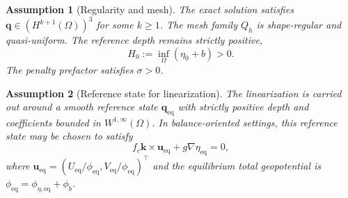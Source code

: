 \documentclass[pdflatex,sn-mathphys-num]{sn-jnl}%
\theoremstyle{thmstyleone}%
\newtheorem{assumption}{Assumption}
\theoremstyle{thmstyletwo}%
\theoremstyle{thmstylethree}%
\begin{document}
\begin{assumption}[Regularity and mesh]
\label{asm:regularity}
The exact solution satisfies $\mathbf{q}\in \left(H^{k+1}(\Omega)\right)^3$ for some $k\ge 1$. The mesh family $Q_h$ is shape-regular and quasi-uniform. The reference depth remains strictly positive,
\[
H_0:=\inf_{\Omega}(\eta_0+b)>0.
\]
The penalty prefactor satisfies $\sigma > 0$.
\end{assumption}

\begin{assumption}[Reference state for linearization]
\label{asm:reference}
The linearization is carried out around a smooth reference state $\mathbf q_{\mathrm{eq}}$ with strictly positive depth and coefficients bounded in $W^{1,\infty}(\Omega)$. 
In balance-oriented settings, this reference state may be chosen to satisfy
\[
f_c\mathbf{k}\times \mathbf{u}_{\mathrm{eq}} + g\nabla \eta_{\mathrm{eq}} = 0,
\]
where $\mathbf{u}_{\mathrm{eq}} = (U_{\mathrm{eq}}/\phi_{\mathrm{eq}}, V_{\mathrm{eq}}/\phi_{\mathrm{eq}})^\top$ and the equilibrium total geopotential is $\phi_{\mathrm{eq}} = \phi_{\eta,\mathrm{eq}} + \phi_b$.
\end{assumption}
\end{document}
